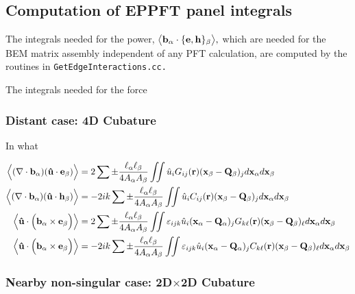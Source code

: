 \subsection{Computation of EPPFT panel integrals}
\newcommand{\lrexpval}[1]{\left\langle #1 \right\rangle}

The integrals needed for the power,
$\big\langle \mathbf{b}_\alpha \cdot \{\mathbf{e},\mathbf{h}\}_{\beta} \big\rangle,$ which are needed 
for the BEM matrix assembly independent of any PFT calculation,
are computed by the routines in \texttt{GetEdgeInteractions.cc.}

The integrals needed for the force

\subsubsection{Distant case: 4D Cubature}

In what

\begin{align*}
 \Expval{(\nabla \cdot \vb b_\alpha)(\vbhat u \cdot \vb e_\beta)}
&=2\sum \pm \frac{\ell_\alpha \ell_\beta}{4A_\alpha A_\beta}
  \iint \hat{u}_i G_{ij}(\vb r) (\vb x_\beta - \vb Q_\beta)_j
d\vb x_\alpha d \vb x_\beta
\\
 \Expval{(\nabla \cdot \vb b_\alpha)(\vbhat u \cdot \vb h_\beta)}
&=-2ik\sum \pm \frac{\ell_\alpha \ell_\beta}{4A_\alpha A_\beta}
  \iint \hat{u}_i C_{ij}(\vb r) (\vb x_\beta - \vb Q_\beta)_j
d\vb x_\alpha d \vb x_\beta
\\
 \lrexpval{ \vbhat{u} \cdot \Big(\vb b_\alpha \times \vb e_\beta\Big)}
&=2\sum \pm \frac{\ell_\alpha \ell_\beta}{4A_\alpha A_\beta}
  \iint \varepsilon_{ijk}
  \hat{u}_i (\vb x_\alpha - \vb Q_\alpha)_j G_{k\ell }(\vb r) (\vb x_\beta - \vb Q_\beta)_\ell
d\vb x_\alpha d \vb x_\beta
\\
 \lrexpval{ \vbhat{u} \cdot \Big(\vb b_\alpha \times \vb e_\beta\Big)}
&=-2ik\sum \pm \frac{\ell_\alpha \ell_\beta}{4A_\alpha A_\beta}
  \iint \varepsilon_{ijk}
  \hat{u}_i (\vb x_\alpha - \vb Q_\alpha)_j C_{k\ell }(\vb r) (\vb x_\beta - \vb Q_\beta)_\ell
d\vb x_\alpha d \vb x_\beta
\end{align*}

\subsubsection{Nearby non-singular case: 2D$\times$2D Cubature}

